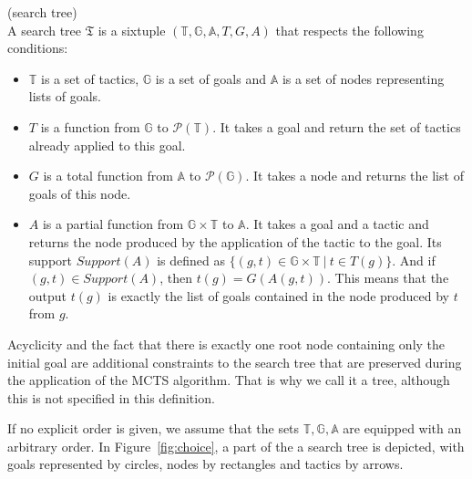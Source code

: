 \documentclass[runningheads,a4paper,draft]{svjour3}
\begin{document}
\begin{definition}\label{def:stree}(search tree)\\
A search tree $\mathfrak{T}$ is a sixtuple
$(\mathbb{T},\mathbb{G},\mathbb{A},T,G,A)$
that respects the following conditions:
\begin{itemize}
\item $\mathbb{T}$ is a set of tactics, $\mathbb{G}$ is a set of goals
 and $\mathbb{A}$ is a set of nodes representing lists of goals.
\item $T$ is a function from $\mathbb{G}$ to $\mathcal{P}(\mathbb{T})$. It 
takes a goal and return the set of tactics already applied to this goal.
\item $G$ is a total function from $\mathbb{A}$ to $\mathcal{P}(\mathbb{G})$. 
It takes a node and returns the list of goals of this node.
\item $A$ is a partial function from $\mathbb{G} \times \mathbb{T}$ to
$\mathbb{A}$. It takes a goal and a tactic and returns the node produced by the
application of the tactic to the goal. Its support $\mathit{Support}(A)$ is 
defined as $\lbrace (g,t) \in \mathbb{G} \times \mathbb{T}\ |\ t \in T(g) 
\rbrace$. And if $(g,t) \in \mathit{Support}(A)$, then $t(g) = G(A(g,t))$. This 
means that the output $t(g)$ is exactly the list 
of goals contained in the node produced by
$t$ from $g$.
\end{itemize}

Acyclicity and the fact that there is exactly
one root node containing only the initial goal are additional constraints to 
the search tree that are preserved during the
application of the MCTS algorithm. That is why we call it a tree, although this
is not specified in this definition. 
\end{definition}

If no explicit order is given, we assume that the sets 
$\mathbb{T},\mathbb{G},\mathbb{A}$ are equipped with an
arbitrary order. In Figure~\ref{fig:choice}, a part of the a search tree is 
depicted, with goals represented by circles, nodes by rectangles and tactics by 
arrows.
\end{document}
